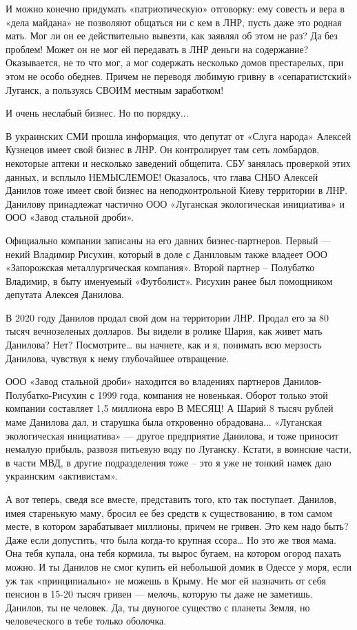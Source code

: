 И можно конечно придумать «патриотическую» отговорку: ему совесть и вера в
«дела майдана» не позволяют общаться ни с кем в ЛНР, пусть даже это родная
мать. Мог ли он ее действительно вывезти, как заявлял об этом не раз? Да без
проблем! Может он не мог ей передавать в ЛНР деньги на содержание? Оказывается,
не то что мог, а мог содержать несколько домов престарелых, при этом не особо
обеднев. Причем не переводя любимую гривну в «сепаратистский» Луганск, а
пользуясь СВОИМ местным заработком!

И очень неслабый бизнес. Но по порядку...

В украинских СМИ прошла информация, что депутат от «Слуга народа» Алексей
Кузнецов имеет свой бизнес в ЛНР. Он контролирует там сеть ломбардов, некоторые
аптеки и несколько заведений общепита. СБУ занялась проверкой этих данных, и
всплыло НЕМЫСЛЕМОЕ! Оказалось, что глава СНБО Алексей Данилов тоже имеет свой
бизнес на неподконтрольной Киеву территории в ЛНР. Данилову принадлежат
частично ООО «Луганская экологическая инициатива» и ООО «Завод стальной дроби».

Официально компании записаны на его давних бизнес-партнеров. Первый — некий
Владимир Рисухин, который в доле с Даниловым также владеет ООО «Запорожская
металлургическая компания». Второй партнер – Полубатко Владимир, в быту
именуемый «Футболист». Рисухин ранее был помощником депутата Алексея Данилова.

В 2020 году Данилов продал свой дом на территории ЛНР. Продал его за 80 тысяч
вечнозеленых долларов. Вы видели в ролике Шария, как живет мать Данилова? Нет?
Посмотрите… вы начнете, как и я, понимать всю мерзость Данилова, чувствуя к
нему глубочайшее отвращение.

ООО «Завод стальной дроби» находится во владениях партнеров
Данилов-Полубатко-Рисухин с 1999 года, компания не новенькая. Оборот только
этой компании составляет 1,5 миллиона евро В МЕСЯЦ! А Шарий 8 тысяч рублей маме
Данилова дал, и старушка была откровенно обрадована... «Луганская экологическая
инициатива» — другое предприятие Данилова, и тоже приносит немалую прибыль,
развозя питьевую воду по Луганску. Кстати, в воинские части, в части МВД, в
другие подразделения тоже – это я уже не тонкий намек даю украинским
«активистам».

А вот теперь, сведя все вместе, представить того, кто так поступает. Данилов,
имея старенькую маму, бросил ее без средств к существованию, в том самом месте,
в котором зарабатывает миллионы, причем не гривен. Это кем надо быть? Даже если
допустить, что была когда-то крупная ссора… Но это же твоя мама. Она тебя
купала, она тебя кормила, ты вырос бугаем, на котором огород пахать можно. И ты
Данилов не смог купить ей небольшой домик в Одессе у моря, если уж так
«принципиально» не можешь в Крыму. Не мог ей назначить от себя пенсион в  15-20
тысяч гривен — мелочь, которую ты даже не заметишь. Данилов, ты не человек. Да,
ты двуногое существо с планеты Земля, но человеческого в тебе только оболочка.

